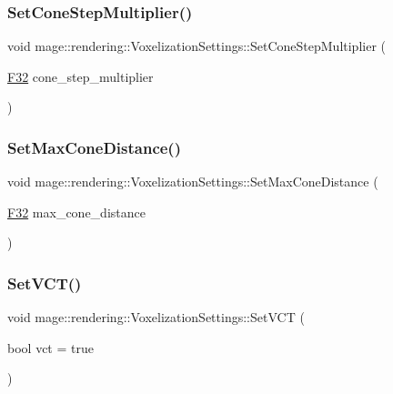 \subsubsection{\texorpdfstring{Set\+Cone\+Step\+Multiplier()}{SetConeStepMultiplier()}}
{\footnotesize\ttfamily void mage\+::rendering\+::\+Voxelization\+Settings\+::\+Set\+Cone\+Step\+Multiplier (\begin{DoxyParamCaption}\item[{\mbox{\hyperlink{namespacemage_aa97e833b45f06d60a0a9c4fc22ae02c0}{F32}}}]{cone\+\_\+step\+\_\+multiplier }\end{DoxyParamCaption})\hspace{0.3cm}{\ttfamily [noexcept]}}

\mbox{\label{classmage_1_1rendering_1_1_voxelization_settings_a137c4c2186b5034f546d0b876cd0633e}} 
\subsubsection{\texorpdfstring{Set\+Max\+Cone\+Distance()}{SetMaxConeDistance()}}
{\footnotesize\ttfamily void mage\+::rendering\+::\+Voxelization\+Settings\+::\+Set\+Max\+Cone\+Distance (\begin{DoxyParamCaption}\item[{\mbox{\hyperlink{namespacemage_aa97e833b45f06d60a0a9c4fc22ae02c0}{F32}}}]{max\+\_\+cone\+\_\+distance }\end{DoxyParamCaption})\hspace{0.3cm}{\ttfamily [noexcept]}}

\mbox{\label{classmage_1_1rendering_1_1_voxelization_settings_a394b58dd3d414a406fd874f7e53b211f}} 
\subsubsection{\texorpdfstring{Set\+V\+C\+T()}{SetVCT()}}
{\footnotesize\ttfamily void mage\+::rendering\+::\+Voxelization\+Settings\+::\+Set\+V\+CT (\begin{DoxyParamCaption}\item[{bool}]{vct = {\ttfamily true} }\end{DoxyParamCaption})\hspace{0.3cm}{\ttfamily [noexcept]}}

